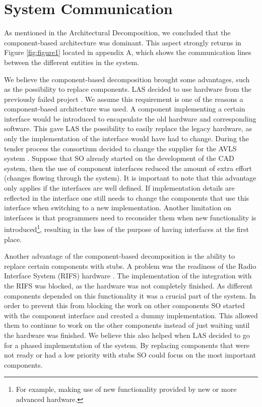 \section*{System Communication}

As mentioned in the Architectural Decomposition, we concluded that the component-based architecture was dominant.
This aspect strongly returns in Figure \ref{fig:figure1} located in appendix A,
which shows the communication lines between the different entities in the system.

We believe the component-based decomposition brought some advantages, such as the possibility to replace components.
LAS decided to use hardware from the previously failed project \autocite[8]{kramer1996succeedings}.
We assume this requirement is one of the reasons a component-based architecture was used.
A component implementing a certain interface would be introduced to encapsulate the old hardware and corresponding software.
This gave LAS the possibility to easily replace the legacy hardware, as only the implementation of the interface would have had to change.
During the tender process the consortium decided to change the supplier for the AVLS system \autocite[3073]{officialreport}.
Suppose that SO already started on the development of the CAD system, then the use of component interfaces reduced the amount of extra effort (changes flowing through the system).
It is important to note that this advantage only applies if the interfaces are well defined.
If implementation details are reflected in the interface one still needs to change the components that use this interface when switching to a new implementation.
Another limitation on interfaces is that programmers need to reconsider them when new functionality is introduced\footnote{For example, making use of new functionality provided by new or more advanced hardware.},
resulting in the loss of the purpose of having interfaces at the first place.

Another advantage of the component-based decomposition is the ability to replace certain components with stubs.
A problem was the readiness of the Radio Interface System (RIFS) hardware \autocite[3074]{officialreport}.
The implementation of the integration with the RIFS was blocked, as the hardware was not completely finished.
As different components depended on this functionality it was a crucial part of the system.
In order to prevent this from blocking the work on other components SO started with the component interface and created a dummy implementation.
This allowed them to continue to work on the other components instead of just waiting until the hardware was finished.
We believe this also helped when LAS decided to go for a phased implementation of the system.
By replacing components that were not ready or had a low priority with stubs SO could focus on the most important components.

